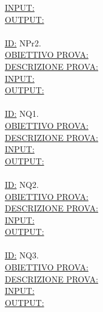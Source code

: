 \documentclass[11pt,titlepage,a4paper]{report}
\begin{document}
\underline{INPUT:}  \\
\underline{OUTPUT:}  \\
\\
\underline{ID:} NPr2.\\
\underline{OBIETTIVO PROVA:}  \\
\underline{DESCRIZIONE PROVA:}  \\
\underline{INPUT:}  \\
\underline{OUTPUT:}  \\
\\
\underline{ID:} NQ1.\\
\underline{OBIETTIVO PROVA:}  \\
\underline{DESCRIZIONE PROVA:}  \\
\underline{INPUT:}  \\
\underline{OUTPUT:}  \\
\\
\underline{ID:} NQ2.\\
\underline{OBIETTIVO PROVA:}  \\
\underline{DESCRIZIONE PROVA:}  \\
\underline{INPUT:}  \\
\underline{OUTPUT:}  \\
\\
\underline{ID:} NQ3.\\
\underline{OBIETTIVO PROVA:}  \\
\underline{DESCRIZIONE PROVA:}  \\
\underline{INPUT:}  \\
\underline{OUTPUT:}  \\
\\
\end{document}
